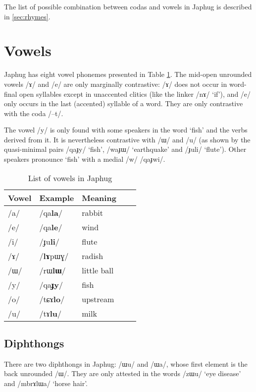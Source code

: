 \documentclass[oldfontcommands,oneside,a4paper,11pt]{article}
\newcommand{\ipa}[1]{/#1/} %
\begin{document}
    
    The list of possible combination between codas and vowels in Japhug is described in \ref{sec:rhymes}.
    
     \section{Vowels} \label{sec:vowels}
     
     
     Japhug has eight vowel phonemes presented in Table \ref{tab:vowels}. The mid-open unrounded vowels \ipa{ɤ} and \ipa{e} are only marginally contrastive: \ipa{ɤ} does not occur in word-final open syllables except in unaccented clitics (like the linker \ipa{nɤ} `if'), and \ipa{e} only occurs in the last (accented) syllable of a word. They are only contrastive with the coda \ipa{--t}.
     
The vowel \ipa{y} is only found with some speakers in the word `fish' and the verbs derived from it. It is nevertheless contrastive with \ipa{ɯ} and \ipa{u} (as shown by the quasi-minimal pairs \ipa{qaɟy} `fish', \ipa{waɟɯ} `earthquake' and \ipa{ɟuli} `flute'). Other speakers pronounce `fish' with a medial \ipa{w} \ipa{qaɟwi}.
     
     \begin{table}
      \caption{List of vowels in Japhug} \label{tab:vowels}  \centering
     \begin{tabular}{lllll}
     \toprule
Vowel & Example & Meaning \\
\midrule
\ipa{a} &	\ipa{qa\textbf{la}} & rabbit\\
\ipa{e} &	\ipa{qa\textbf{le}} &wind\\
\ipa{i} &	\ipa{ɟu\textbf{li}} &flute\\
\ipa{ɤ} &	\ipa{\textbf{lɤ}pɯɣ} & radish\\
\ipa{ɯ} &	\ipa{rɯ\textbf{lɯ}} &little ball\\
\ipa{y} &	\ipa{qa\textbf{ɟy}} &fish\\
\ipa{o} &	\ipa{tɕɤ\textbf{lo}} &upstream\\
\ipa{u} &	\ipa{tɤ\textbf{lu}} &milk\\
     \bottomrule
     \end{tabular}
     \end{table}
     
     
          \subsection{Diphthongs}
          
          There are two diphthongs in Japhug: \ipa{ɯu} and \ipa{ɯa}, whose first element is the back unrounded \ipa{ɯ}. They are only attested in the words \ipa{zɯu} `eye disease' and \ipa{mbrɤlɯa} `horse hair'. 
          
\end{document}
